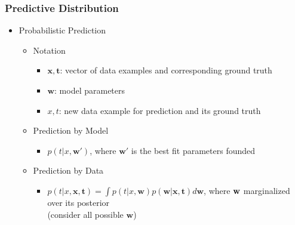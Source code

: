 \subsubsection{Predictive Distribution}
\begin{itemize}
\item Probabilistic Prediction
	\begin{itemize}
	\item Notation
		\begin{itemize}
		\item $\mathbf x, \mathbf t$: vector of data examples and corresponding ground truth
		\item $\mathbf w$: model parameters
		\item $x, t$: new data example for prediction and its ground truth
		\end{itemize}
	\item Prediction by Model
		\begin{itemize}
		\item $p(t|x, \mathbf w')$, where $\mathbf w'$ is the best fit parameters founded
		\end{itemize}
	\item Prediction by Data
		\begin{itemize}
		\item $\displaystyle p(t|x,\mathbf{x},\mathbf{t}) = \int p(t|x,\mathbf{w})p(\mathbf{w}|\mathbf{x},\mathbf{t}) d\mathbf w$, where $\bf w$ marginalized over its posterior \\
		(consider all possible $\mathbf w$)
		\end{itemize}
	\end{itemize}
\end{itemize}